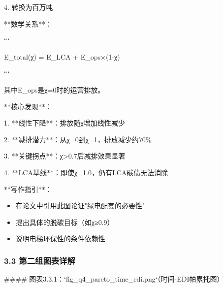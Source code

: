 \documentclass[a4paper,12pt]{article}
\begin{document}
\par
4. 转换为百万吨

\par
**数学关系**：

\par
```

\par
E\_total(χ) = E\_LCA + E\_ops×(1-χ)

\par
```

\par
其中E\_ops是χ=0时的运营排放。

\par
**核心发现**：

\par
1. **线性下降**：排放随χ增加线性减少

\par
2. **减排潜力**：从χ=0到χ=1，排放减少约70\%

\par
3. **关键拐点**：χ>0.7后减排效果显著

\par
4. **LCA基线**：即使χ=1.0，仍有LCA碳债无法消除

\par
**写作指引**：

\par
\begin{itemize}
\item 在论文中引用此图论证"绿电配套的必要性"
\end{itemize}
\begin{itemize}
\item 提出具体的脱碳目标（如χ≥0.9）
\end{itemize}
\begin{itemize}
\item 说明电梯环保性的条件依赖性
\end{itemize}
\subsubsection{3.3 第二组图表详解}
#### 图表3.3.1：`fig\_q4\_pareto\_time\_edi.png`（时间-EDI帕累托图）
\end{document}
